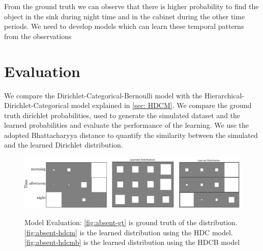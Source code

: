 From the ground truth we can observe that there is higher probability to find the object in the sink during night time and in the cabinet during the other time periods. We need to develop models which can learn these temporal patterns from the observations

\section{Evaluation}


We compare the Dirichlet-Categorical-Bernoulli model with the Hierarchical-Dirichlet-Categorical model explained in \ref{sec: HDCM}. We compare the ground truth dirichlet probabilities, used to generate the simulated dataset and the learned probabilities and evaluate the performance of the learning. 
We use the adopted  Bhattacharyya distance \cite{rauber2008bhattacharyya} to quantify the similarity between the simulated and the learned Dirichlet distribution.
\begin{figure}
    \centering
    \includegraphics[width=\textwidth]{images/absent_learned.png}
       
    \begin{minipage}[t]{.35\textwidth}
    \label{fig:absent-gt}
    \end{minipage}%
    \begin{minipage}[t]{.3\textwidth}
    \label{fig:absent-hdcm}
    \end{minipage}
    \begin{minipage}[t]{.25\textwidth}
    \label{fig:absent-hdcmb}
    \end{minipage}

\caption[Model Evaluation of HDC and HDCB ]{Model Evaluation: \ref{fig:absent-gt} is ground truth of the distribution. \ref{fig:absent-hdcm} is the learned distribution using the HDC model. \ref{fig:absent-hdcmb} is the learned distribution using the HDCB  model }
        \label{fig:absent-eval}
    
\end{figure}


